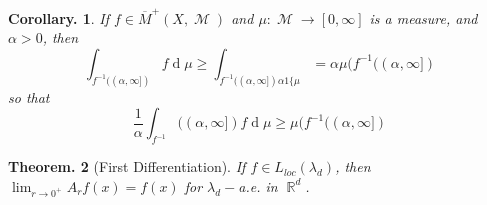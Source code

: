 \documentclass[11pt, a4paper]{memoir}
\DeclareMathOperator{\R}{{\mathbb{R}}}
\newcommand{\ol}[1]{\ensuremath{\overline{#1}}}
\theoremstyle{change}
\newtheorem{theorem}{Theorem.}[section]
\newtheorem{corollary}[theorem]{Corollary.}
\theoremstyle{plain}
\theoremstyle{nonumberplain}
\DeclareMathOperator{\M}{{\mathcal{M}}}
\renewcommand{\d}[1]{\ensuremath{\operatorname{d}\!{#1}}}
\numberwithin{equation}{section}
\begin{document}
\begin{corollary}
    If $f\in\ol{M}^+(X,\M)$ and $\mu:\M\to[0,\infty]$ is a measure, and $\alpha>0$, then
    \begin{equation*}
        \int_{f^{-1}((\alpha,\infty])}f\d{\mu}\geq\int_{f^{-1}((\alpha,\infty])\alpha 1\{\mu}=\alpha\mu(f^{-1}((\alpha,\infty])
    \end{equation*}
    so that
    \begin{equation*}
        \frac{1}{\alpha}\int_{f^{-1}}((\alpha,\infty])f\d{\mu}\geq\mu(f^{-1}((\alpha,\infty])
    \end{equation*}
\end{corollary}
\begin{theorem}[First Differentiation]
    If $f\in L_{loc}(\lambda_d)$, then $\lim_{r\to 0^+}A_rf(x)=f(x)$ for $\lambda_d-$a.e. in $\R^d$.
\end{theorem}
\end{document}
